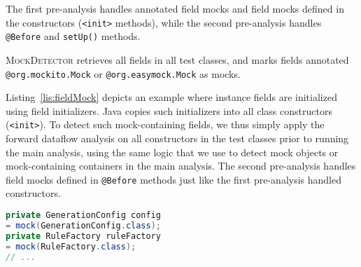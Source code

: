 The first pre-analysis handles annotated field mocks and field mocks defined in the constructors (\texttt{<init>} methods), while the second pre-analysis handles \texttt{@Before} and \texttt{setUp()} methods. 

\textsc{MockDetector} retrieves all fields in all test classes, and marks fields annotated {\tt @org.mockito.Mock} or {\tt @org.easymock.Mock} as mocks.

Listing~\ref{lis:fieldMock} depicts an example where instance fields are initialized using field initializers. Java copies such initializers into all class constructors (\texttt{<init>}). To detect such mock-containing fields, we thus simply apply the forward dataflow analysis on all constructors in the test classes prior to running the main analysis, using the same logic that we use to detect mock objects or mock-containing containers in the main analysis. The second pre-analysis handles field mocks defined in \texttt{@Before} methods just like the first pre-analysis handled constructors.





\begin{lstlisting}[basicstyle=\ttfamily, caption={Example for field mocks defined by field initializations from \texttt{TypeRuleTest.java} in jsonschema2pojo.},
basicstyle=\scriptsize\ttfamily,language = Java, framesep=4.5mm,
framexleftmargin=1mm, captionpos=b, label=lis:fieldMock]
private GenerationConfig config
= mock(GenerationConfig.class);
private RuleFactory ruleFactory
= mock(RuleFactory.class);
// ...
\end{lstlisting}

